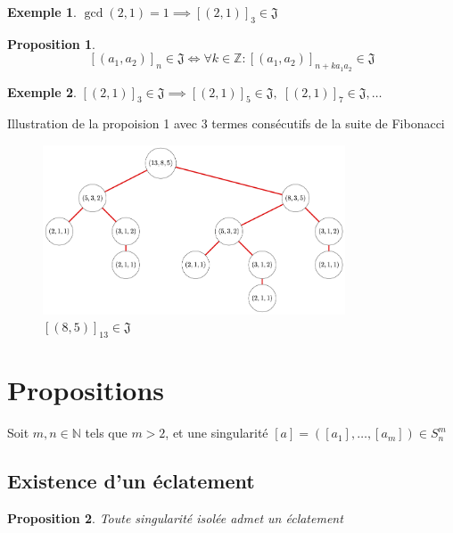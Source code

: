 \documentclass{article}
\newtheorem{proposition}{Proposition}
\newtheorem{example}{Exemple}
\begin{document}
\begin{example}
    $\gcd(2, 1) = 1 \implies {[(2, 1)]}_3 \in \mathfrak{J}$
\end{example}

\begin{proposition}
    \[ 
    {[(a_1, a_2)]}_n \in \mathfrak{J} \iff 
    \forall k \in \mathbb{Z}: {[(a_1, a_2)]}_{n+ka_1a_2} \in \mathfrak{J} 
    \]
\end{proposition}

\begin{example}
    ${[(2, 1)]}_3 \in \mathfrak{J} \implies {[(2, 1)]}_5 \in \mathfrak{J},\; {[(2, 1)]}_7 \in \mathfrak{J}, \dots$
\end{example}

\newpage

Illustration de la propoision 1 avec 3 termes consécutifs de la suite de Fibonacci

\begin{figure}[h]
    \caption{${[(8, 5)]}_{13} \in \mathfrak{J}$}
    \centering
    \includegraphics[width=0.8\textwidth]{fibo}
\end{figure}

\section{Propositions}

Soit $m, n \in \mathbb{N}$ tels que $m > 2$, et une singularité $[a] = ([a_1], \dots, [a_m]) \in S_n^m$

\subsection{Existence d'un éclatement}

\begin{proposition}
    Toute singularité isolée admet un éclatement
\end{proposition}
\end{document}
